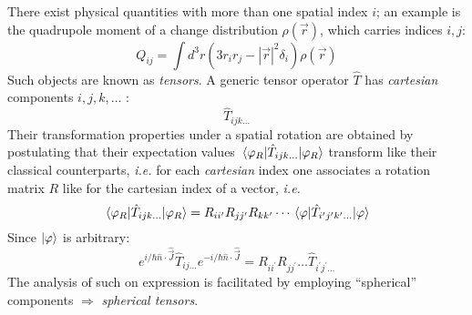 \documentclass[12pt]{article}
\newcommand{\be}{\begin{equation}}
\newcommand{\ee}{\end{equation}}
\begin{document}
There exist physical quantities with more than one
spatial index $i$; an example is the quadrupole moment
of a change distribution \(\rho(\vec{r})\), which carries indices $i,j$:
\be
Q_{i j}=\int d^{3} r\left(3 r_{i} r_{j}-|\vec{r}|^{2} \delta_{i}\right) \rho(\vec{r})
\ee
Such objects are known as \emph{tensors}. A generic
tensor operator \(\hat{T}\) has \emph{cartesian} components \(i, j, k, \ldots\) :
\be
\hat{T}_{i j k\ldots}
\ee
Their transformation properties under a spatial rotation are
obtained by postulating that their expectation
values $\ev*{\hat{T}_{ijk\ldots}}{\varphi_R}$ transform like their classical
counterparts, \textit{i.e.} for each \emph{cartesian} index one associates
a rotation matrix \(R\) like for the cartesian index of
a vector, \textit{i.e.}
\be
\ev*{\hat{T}_{ijk\ldots}}{\varphi_R} = R_{ii^\prime}R_{jj^\prime}R_{kk^\prime}\cdots
\ev*{\hat{T}_{i^\prime j^\prime k^\prime\ldots}}{\varphi}
\ee
Since $\ket{\varphi}$ is arbitrary:
\be
e^{i/\hbar \hat{n}\cdot\hat{\vec{J}}}
\hat{T}_{ij\ldots}
e^{-i/\hbar \hat{n}\cdot\hat{\vec{J}}}
=
R_{ii^\prime}R_{jj^\prime}\ldots\hat{T}_{i^\prime j^\prime\ldots}
\ee
The analysis of such on expression is facilitated by
employing ``spherical'' components \(\Rightarrow\) \emph{spherical tensors}.

\end{document}
